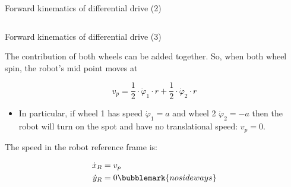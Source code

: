 \documentclass[compress]{beamer}
\begin{document}
\begin{frame}{Forward kinematics of differential drive (2)}
\begin{columns}
\begin{column}{0.5\linewidth}
{
            }

        \end{column}
    \end{columns}

\end{frame}

\begin{frame}{Forward kinematics of differential drive (3)}

    The contribution of both wheels can be added together. So, when both
    wheel spin, the robot's mid point moves at

    \[
    v_p = \frac{1}{2}\cdot \dot\varphi_1\cdot r + \frac{1}{2}\cdot \dot\varphi_2\cdot r
    \]


            \begin{itemize}
                \item In particular, if wheel 1 has speed $\dot\varphi_1 = a$ and wheel 2 $\dot\varphi_2 = -a$ then the robot will turn
                    on the spot and have no translational speed: $v_p = 0$.
            \end{itemize}

    \pause

    The speed in the robot reference frame is:

    \begin{align*}
        \dot{x}_R &= v_p \\
        \dot{y}_R &= 0\bubblemark{nosideways}
    \end{align*}


\end{frame}
\end{document}
